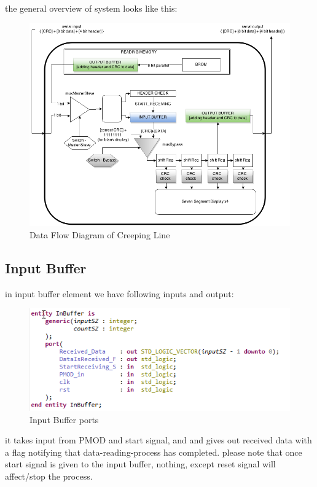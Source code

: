 \documentclass{article}
\begin{document}
the general overview of system looks like this: 
\begin{figure}[H]
    \centering
   
 \includegraphics[scale=0.4]{CreepingLineDataFlow.png}
    \caption{Data Flow Diagram of Creeping Line}
    \label{fig:CreepingLineDataFlow}
\end{figure}


\vfill


\subsection{Input Buffer}

in input buffer element we have following inputs and output:
\begin{figure}[H]
    \centering
    \includegraphics[scale=0.7]{InBuffer.png}
    \caption{Input Buffer ports}
    \label{fig:InBuffer}
\end{figure}
it takes input from PMOD and start signal, and and gives out received data with a flag notifying that data-reading-process has completed. please note that once start signal is given to the input buffer, nothing, except reset signal will affect/stop the process.
\end{document}
